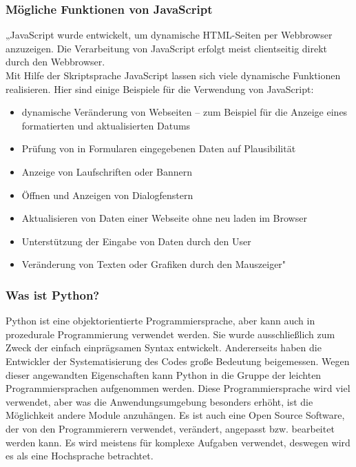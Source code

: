 \subsubsection{Mögliche Funktionen von JavaScript} 
„JavaScript wurde entwickelt, um dynamische HTML-Seiten per Webbrowser anzuzeigen. Die Verarbeitung von JavaScript erfolgt meist clientseitig direkt durch den Webbrowser. \\
Mit Hilfe der Skriptsprache JavaScript lassen sich viele dynamische Funktionen realisieren. Hier sind einige Beispiele für die Verwendung von JavaScript:
\begin{itemize}
	\item  dynamische Veränderung von Webseiten – zum Beispiel für die Anzeige eines formatierten und aktualisierten Datums
\end{itemize}
\begin{itemize}
	\item Prüfung von in Formularen eingegebenen Daten auf Plausibilität
\end{itemize}
\begin{itemize}
	\item Anzeige von Laufschriften oder Bannern
\end{itemize}
\begin{itemize}
	\item 	Öffnen und Anzeigen von Dialogfenstern
\end{itemize}
\begin{itemize}
	\item Aktualisieren von Daten einer Webseite ohne neu laden im Browser
\end{itemize}
\begin{itemize}
	\item 	Unterstützung der Eingabe von Daten durch den User
\end{itemize}
\begin{itemize}
	\item Veränderung von Texten oder Grafiken durch den Mauszeiger" \cite{50_javascript}
\end{itemize}
\subsubsection{Was ist Python?} 
Python ist eine objektorientierte Programmiersprache, aber kann auch in prozedurale Programmierung verwendet werden. Sie wurde ausschließlich zum Zweck der einfach einprägsamen Syntax entwickelt. Andererseits haben die Entwickler der Systematisierung des Codes große Bedeutung beigemessen. Wegen dieser angewandten Eigenschaften kann Python in die Gruppe der leichten Programmiersprachen aufgenommen werden. Diese Programmiersprache wird viel verwendet, aber was die Anwendungsumgebung besonders erhöht, ist die Möglichkeit andere Module anzuhängen. Es ist auch eine Open Source Software, der von den Programmierern verwendet, verändert, angepasst bzw. bearbeitet werden kann. Es wird meistens für komplexe Aufgaben verwendet, deswegen wird es als eine Hochsprache betrachtet. \cite{50_python}
